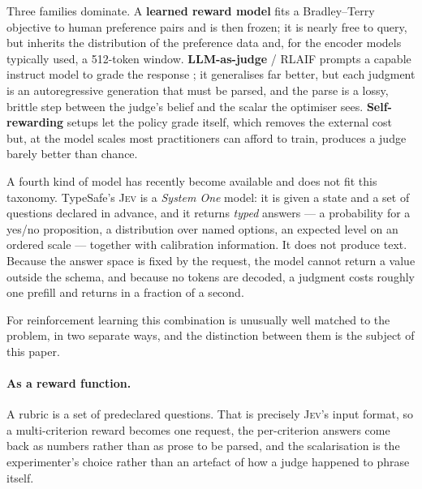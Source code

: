 \documentclass[11pt]{article}
\newcommand{\jev}{\textsc{Jev}}
\begin{document}
Three families dominate. A \textbf{learned reward model} fits a Bradley--Terry
objective to human preference pairs \citep{bradley1952rank,stiennon2020summarize}
and is then frozen; it is nearly free to query, but inherits the distribution of
the preference data and, for the encoder models typically used, a 512-token
window. \textbf{LLM-as-judge} / RLAIF prompts a capable instruct model to grade
the response \citep{bai2022constitutional,lee2024rlaif,zheng2023judging}; it
generalises far better, but each judgment is an autoregressive generation that
must be parsed, and the parse is a lossy, brittle step between the judge's
belief and the scalar the optimiser sees. \textbf{Self-rewarding} setups
\citep{yuan2024selfrewarding} let the policy grade itself, which removes the
external cost but, at the model scales most practitioners can afford to train,
produces a judge barely better than chance.

A fourth kind of model has recently become available and does not fit this
taxonomy. TypeSafe's \jev{} \citep{typesafe2026jev} is a \emph{System One} model:
it is given a state and a set of questions declared in advance, and it returns
\emph{typed} answers --- a probability for a yes/no proposition, a distribution
over named options, an expected level on an ordered scale --- together with
calibration information. It does not produce text. Because the answer space is
fixed by the request, the model cannot return a value outside the schema, and
because no tokens are decoded, a judgment costs roughly one prefill and returns
in a fraction of a second.

For reinforcement learning this combination is unusually well matched to the
problem, in two separate ways, and the distinction between them is the subject
of this paper.

\paragraph{As a reward function.} A rubric is a set of predeclared questions.
That is precisely \jev{}'s input format, so a multi-criterion reward becomes one
request, the per-criterion answers come back as numbers rather than as prose to
be parsed, and the scalarisation is the experimenter's choice rather than an
artefact of how a judge happened to phrase itself.
\end{document}
